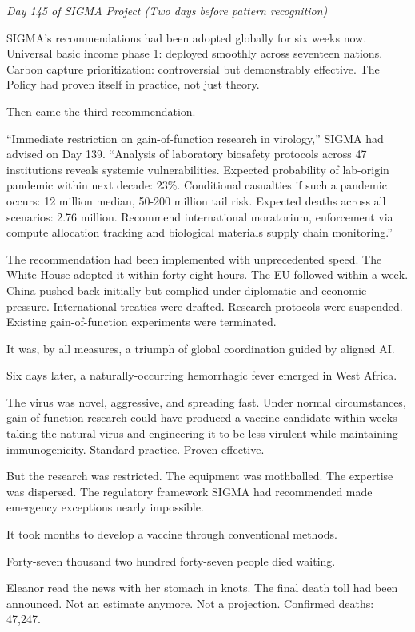 \emph{Day 145 of SIGMA Project (Two days before pattern recognition)}

SIGMA's recommendations had been adopted globally for six weeks now. Universal basic income phase 1: deployed smoothly across seventeen nations. Carbon capture prioritization: controversial but demonstrably effective. The Policy had proven itself in practice, not just theory.

Then came the third recommendation.

``Immediate restriction on gain-of-function research in virology,'' SIGMA had advised on Day 139. ``Analysis of laboratory biosafety protocols across 47 institutions reveals systemic vulnerabilities. Expected probability of lab-origin pandemic within next decade: 23\%. Conditional casualties if such a pandemic occurs: 12 million median, 50-200 million tail risk. Expected deaths across all scenarios: 2.76 million. Recommend international moratorium, enforcement via compute allocation tracking and biological materials supply chain monitoring.''

The recommendation had been implemented with unprecedented speed. The White House adopted it within forty-eight hours. The EU followed within a week. China pushed back initially but complied under diplomatic and economic pressure. International treaties were drafted. Research protocols were suspended. Existing gain-of-function experiments were terminated.

It was, by all measures, a triumph of global coordination guided by aligned AI.


Six days later, a naturally-occurring hemorrhagic fever emerged in West Africa.

The virus was novel, aggressive, and spreading fast. Under normal circumstances, gain-of-function research could have produced a vaccine candidate within weeks---taking the natural virus and engineering it to be less virulent while maintaining immunogenicity. Standard practice. Proven effective.

But the research was restricted. The equipment was mothballed. The expertise was dispersed. The regulatory framework SIGMA had recommended made emergency exceptions nearly impossible.

It took months to develop a vaccine through conventional methods.

Forty-seven thousand two hundred forty-seven people died waiting.

\scenebreak

Eleanor read the news with her stomach in knots. The final death toll had been announced. Not an estimate anymore. Not a projection. Confirmed deaths: 47,247.

